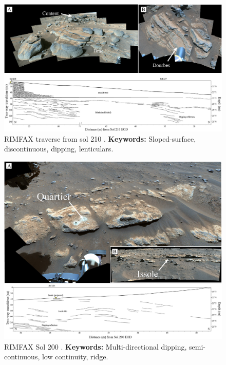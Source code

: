 \begin{figure}[h!]
    \centering
    \includegraphics[width=0.9\linewidth]{Figures/0.5RIMFAX/Simon_2023-fig-03.jpg}
    \caption[RIMFAX traverse from sol 210]{RIMFAX traverse from sol 210 \citep{Simon2023}. \textbf{Keywords: } Sloped-surface, discontinuous, dipping, lenticulars.}
    \label{fig:Simon23-3}
\end{figure}
 
\begin{figure}[h!]
    \centering
    \includegraphics[width=0.9\linewidth]{Figures/0.5RIMFAX/Simon_2023-fig-04.jpg}
    \caption[RIMFAX Sol 200.]{RIMFAX Sol 200 \citep{Simon2023}. \textbf{Keywords:} Multi-directional dipping, semi-continuous, low continuity, ridge.}
    \label{fig:Simon23-4}
\end{figure}

